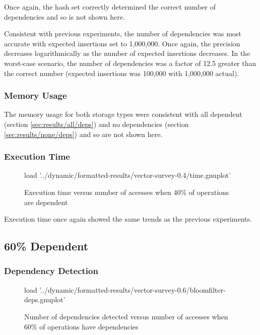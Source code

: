 		Once again, the hash set correctly determined the correct number of dependencies and so is not shown here.
			
		Consistent with previous experiments, the number of dependencies was most accurate with expected insertions set to 1,000,000. Once again, the precision decreases logarithmically as the number of expected insertions decreases. In the worst-case scenario, the number of dependencies was a factor of 12.5 greater than the correct number (expected insertions was 100,000 with 1,000,000 actual).
		
		\subsubsection{Memory Usage} \label{sec:results/40/mem}
		The memory usage for both storage types were consistent with all dependent (section \ref{sec:results/all/deps}) and no dependencies (section \ref{sec:results/none/deps}) and so are not shown here.
		
		\subsubsection{Execution Time} \label{sec:results/40/time}
		\begin{figure}
			\centering
			\begin{gnuplot}[terminal=pdf]
				load '../dynamic/formatted-results/vector-survey-0.4/time.gnuplot'
			\end{gnuplot}
			\caption{Execution time versus number of accesses when 40\% of operations are dependent}
			\label{chart:40-time}
		\end{figure}
		
		Execution time once again showed the same trends as the previous experiments.
		
	\subsection{60\% Dependent} \label{sec:results/60}
		\subsubsection{Dependency Detection} \label{sec:results/60/deps}
		\begin{figure}
			\centering
			\begin{gnuplot}[terminal=pdf]
				load '../dynamic/formatted-results/vector-survey-0.6/bloomfilter-deps.gnuplot'
			\end{gnuplot}
			\caption{Number of dependencies detected versus number of accesses when 60\% of operations have dependencies}
			\label{chart:60-dep}
		\end{figure}
		
